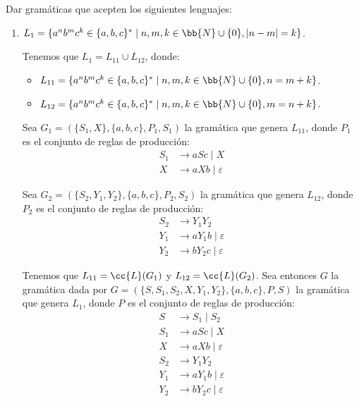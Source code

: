 \documentclass[12pt]{article}
\begin{document}
    \begin{ejercicio}
        Dar gramáticas que acepten los siguientes lenguajes:
        \begin{enumerate}
            \item $L_1 = \{a^nb^mc^k \in \{a,b,c\}^\ast \mid n,m,k\in \bb{N}\cup\{0\}, |n-m|=k\}$.
            
            Tenemos que $L_1=L_{11}\cup L_{12}$, donde:
            \begin{itemize}
                \item $L_{11} = \{a^nb^mc^k \in \{a,b,c\}^\ast \mid n,m,k\in \bb{N}\cup\{0\}, n=m+k\}$.
                \item $L_{12} = \{a^nb^mc^k \in \{a,b,c\}^\ast \mid n,m,k\in \bb{N}\cup\{0\}, m=n+k\}$.
            \end{itemize}

            Sea $G_1=(\{S_1,X\}, \{a,b,c\}, P_1, S_1)$ la gramática que genera $L_{11}$, donde $P_1$ es el conjunto de reglas de producción:
            \begin{align*}
                S_1 &\rightarrow aSc\mid X\\
                X &\rightarrow aXb \mid \varepsilon
            \end{align*}

            Sea $G_{2}=(\{S_{2},Y_1,Y_2\}, \{a,b,c\}, P_{2}, S_{2})$ la gramática que genera $L_{12}$, donde $P_{2}$ es el conjunto de reglas de producción:
            \begin{align*}
                S_{2} &\rightarrow Y_1Y_2\\
                Y_1 &\rightarrow aY_1b \mid \varepsilon\\
                Y_2 &\rightarrow bY_2c \mid \varepsilon
            \end{align*}

            Tenemos que $L_{11}=\cc{L}(G_1)$ y $L_{12}=\cc{L}(G_2)$. Sea entonces $G$ la gramática dada por $G=(\{S,S_1,S_2,X,Y_1,Y_2\}, \{a,b,c\}, P, S)$ la gramática que genera $L_1$, donde $P$ es el conjunto de reglas de producción:
            \begin{align*}
                S &\rightarrow S_1 \mid S_2\\
                S_1 &\rightarrow aSc\mid X\\
                X &\rightarrow aXb \mid \varepsilon\\
                S_{2} &\rightarrow Y_1Y_2\\
                Y_1 &\rightarrow aY_1b \mid \varepsilon\\
                Y_2 &\rightarrow bY_2c \mid \varepsilon
            \end{align*}


\end{enumerate}
\end{ejercicio}
\end{document}
